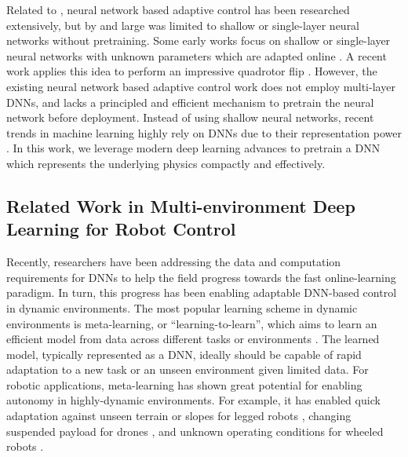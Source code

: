 Related to \nf, neural network based adaptive control has been researched extensively, but by and large was limited to shallow or single-layer neural networks without pretraining. 
Some early works focus on shallow or single-layer neural networks with unknown parameters which are adapted online \cite{farrell_adaptive_2006, nakanishi_locally_2002,chen1995adaptive,johnson2003limited,narendra1997adaptive}.
A recent work applies this idea to perform an impressive quadrotor flip \cite{bisheban_geometric_2021}. However, the existing neural network based adaptive control work does not employ multi-layer DNNs, and lacks a principled and efficient mechanism to pretrain the neural network before deployment.
Instead of using shallow neural networks, recent trends in machine learning highly rely on DNNs due to their representation power \cite{lecun2015deep}. 
In this work, we leverage modern deep learning advances to pretrain a DNN which represents the underlying physics compactly and effectively.

\subsection*{Related Work in Multi-environment Deep Learning for Robot Control}
Recently, researchers have been addressing the data and computation requirements for DNNs to help the field progress towards the fast online-learning paradigm. In turn, this progress has been enabling adaptable DNN-based control in dynamic environments.  
The most popular learning scheme in dynamic environments is meta-learning, or ``learning-to-learn'', which aims to learn an efficient model from data across different tasks or environments \cite{finn2017model,meta-learning-survey,shi2021meta}. The learned model, typically represented as a DNN, ideally should be capable of rapid adaptation to a new task or an unseen environment given limited data. For robotic applications, meta-learning has shown great potential for enabling autonomy in highly-dynamic environments.
For example, it has enabled quick adaptation against unseen terrain or slopes for legged robots \cite{nagabandi2018learning,song2020rapidly}, changing suspended payload for drones \cite{belkhale2021model}, and unknown operating conditions for wheeled robots \cite{mckinnon2021meta}.

